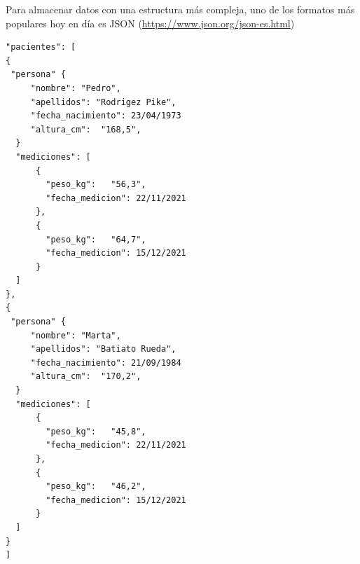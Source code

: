 \documentclass[spanish,12pt,a4paper,final,oneside]{book}
\begin{document}
Para almacenar datos con una estructura más compleja, uno de los formatos más populares hoy en día es JSON (\url{https://www.json.org/json-es.html})

\begin{lstlisting}[frame=single, basicstyle=\scriptsize]
"pacientes": [
{
 "persona" {
     "nombre": "Pedro",
     "apellidos": "Rodrigez Pike",
     "fecha_nacimiento": 23/04/1973
     "altura_cm":  "168,5",
  }
  "mediciones": [
      {
        "peso_kg":   "56,3",
        "fecha_medicion": 22/11/2021
      },
      {
        "peso_kg":   "64,7",
        "fecha_medicion": 15/12/2021
      }
  ]
},
{
 "persona" {
     "nombre": "Marta",
     "apellidos": "Batiato Rueda",
     "fecha_nacimiento": 21/09/1984
     "altura_cm":  "170,2",
  }
  "mediciones": [
      {
        "peso_kg":   "45,8",
        "fecha_medicion": 22/11/2021
      },
      {
        "peso_kg":   "46,2",
        "fecha_medicion": 15/12/2021
      }
  ]
}
]  
\end{lstlisting}
\end{document}
